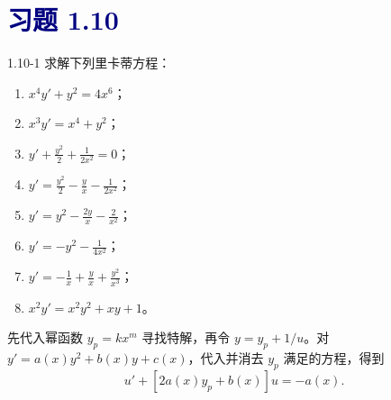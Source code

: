 \documentclass[UTF8,a4paper,11pt]{ctexart}
\newcommand{\sect}[1]{\section*{\textcolor{navy}{习题 #1}}}
\begin{document}
\sect{1.10}
\begin{problem}{1.10-1}
求解下列里卡蒂方程：
  \begin{enumerate}[label=(\arabic*)]
    \item $\displaystyle x^4y'+y^2=4x^6$；
    \item $\displaystyle x^3y'=x^4+y^2$；
    \item $\displaystyle y'+\frac{y^2}{2}+\frac{1}{2x^2}=0$；
    \item $\displaystyle y'=\frac{y^2}{2}-\frac{y}{x}-\frac{1}{2x^2}$；
    \item $\displaystyle y'=y^2-\frac{2y}{x}-\frac{2}{x^2}$；
    \item $\displaystyle y'=-y^2-\frac{1}{4x^2}$；
    \item $\displaystyle y'=-\frac1x+\frac yx+\frac{y^2}{x^3}$；
    \item $\displaystyle x^2y'=x^2y^2+xy+1$。
  \end{enumerate}
\end{problem}

\begin{analysis}
先代入幂函数 $y_p=kx^m$ 寻找特解，再令 $y=y_p+1/u$。对
$y'=a(x)y^2+b(x)y+c(x)$，代入并消去 $y_p$ 满足的方程，得到
\[
u'+[2a(x)y_p+b(x)]u=-a(x).
\]
\end{analysis}
\end{document}
